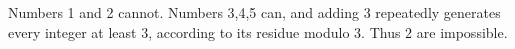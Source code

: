 Numbers 1 and 2 cannot. Numbers 3,4,5 can, and adding 3 repeatedly generates every integer at least 3, according to its residue modulo 3. Thus $\boxed2$ are impossible.
